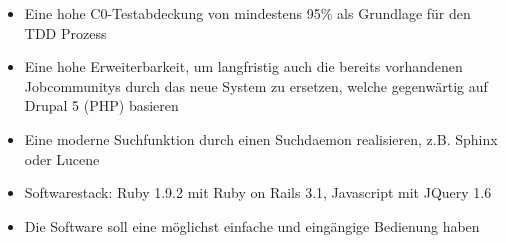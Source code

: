 \begin{itemize}
 \item Eine hohe C0-Testabdeckung von mindestens 95\% als Grundlage für den TDD Prozess
 \item Eine hohe Erweiterbarkeit, um langfristig auch die bereits vorhandenen Jobcommunitys durch das neue System zu ersetzen, welche gegenwärtig auf Drupal 5 (PHP) basieren
 \item Eine moderne Suchfunktion durch einen Suchdaemon realisieren, z.B. Sphinx oder Lucene
 \item Softwarestack: Ruby 1.9.2 mit Ruby on Rails 3.1, Javascript mit JQuery 1.6
 \item Die Software soll eine möglichst einfache und eingängige Bedienung haben
\end{itemize}

